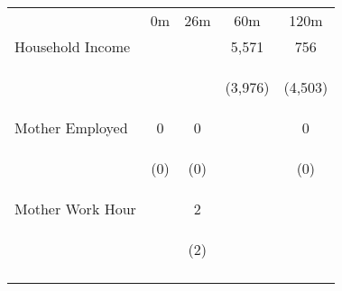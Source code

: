 \begin{tabular}{lcccc}
\hline \noalign{\smallskip} & 0m & 26m & 60m & 120m\\
\noalign{\smallskip}\hline \noalign{\smallskip}Household Income &  &  & 5,571 & 756\\
 & \begin{footnotesize}\end{footnotesize} & \begin{footnotesize}\end{footnotesize} & \begin{footnotesize}(3,976)\end{footnotesize} & \begin{footnotesize}(4,503)\end{footnotesize}\\
\noalign{\smallskip}Mother Employed & 0 & 0 &  & 0\\
 & \begin{footnotesize}(0)\end{footnotesize} & \begin{footnotesize}(0)\end{footnotesize} & \begin{footnotesize}\end{footnotesize} & \begin{footnotesize}(0)\end{footnotesize}\\
\noalign{\smallskip}Mother Work Hour &  & 2 &  & \\
 & \begin{footnotesize}\end{footnotesize} & \begin{footnotesize}(2)\end{footnotesize} & \begin{footnotesize}\end{footnotesize} & \begin{footnotesize}\end{footnotesize}\\
\noalign{\smallskip}\hline\end{tabular}\\
